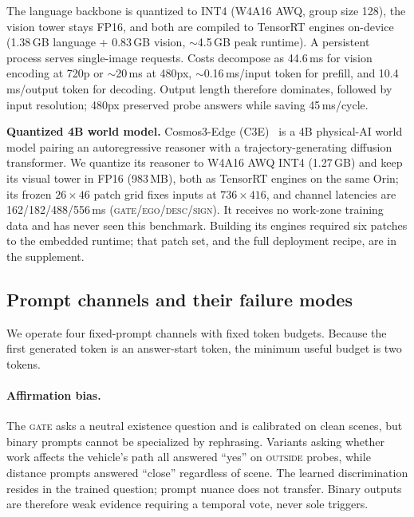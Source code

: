 \documentclass[10pt,twocolumn,letterpaper]{article}
\begin{document}
The language backbone is quantized to INT4 (W4A16 AWQ, group size 128), the vision tower stays FP16, and both are compiled to TensorRT engines on-device~\cite{trtedgellm} (1.38\,GB language + 0.83\,GB vision, $\sim$4.5\,GB peak runtime).  A persistent process serves single-image requests.  Costs decompose as 44.6\,ms for vision encoding at 720p or $\sim$20\,ms at 480px, $\sim$0.16\,ms/input token for prefill, and 10.4\,ms/output token for decoding.  Output length therefore dominates, followed by input resolution; 480px preserved probe answers while saving 45\,ms/cycle.

\textbf{Quantized 4B world model.}  Cosmos3-Edge (C3E)~\cite{nvidia2026cosmos3} is a 4B physical-AI world model pairing an autoregressive reasoner with a trajectory-generating diffusion transformer.  We quantize its reasoner to W4A16 AWQ INT4 (1.27\,GB) and keep its visual tower in FP16 (983\,MB), both as TensorRT engines on the same Orin; its frozen $26{\times}46$ patch grid fixes inputs at $736{\times}416$, and channel latencies are 162/182/488/556\,ms (\textsc{gate}/\textsc{ego}/\textsc{desc}/\textsc{sign}).  It receives no work-zone training data and has never seen this benchmark.  Building its engines required six patches to the embedded runtime; that patch set, and the full deployment recipe, are in the supplement.

\subsection{Prompt channels and their failure modes}
\label{sec:prompts}

We operate four fixed-prompt channels with fixed token budgets.  Because the first generated token is an answer-start token, the minimum useful budget is two tokens.


\paragraph{Affirmation bias.} The \textsc{gate} asks a neutral existence question and is calibrated on clean scenes, but binary prompts cannot be specialized by rephrasing.  Variants asking whether work affects the vehicle's path all answered ``yes'' on \textsc{outside} probes, while distance prompts answered ``close'' regardless of scene.  The learned discrimination resides in the trained question; prompt nuance does not transfer.  Binary outputs are therefore weak evidence requiring a temporal vote, never sole triggers.
\end{document}
